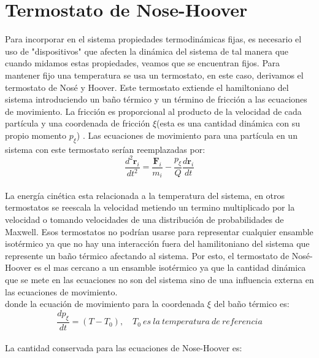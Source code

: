 \section{Termostato de Nose-Hoover}

Para incorporar en el sistema propiedades termodinámicas fijas, es necesario el uso de "dispositivos" que afecten la dinámica del sistema de tal manera que cuando midamos estas propiedades, veamos que se encuentran fijos. Para mantener fijo una temperatura se usa un termostato, en este caso, derivamos el termostato de Nosé y Hoover. Este termostato extiende el hamiltoniano del sistema introduciendo un baño térmico y un término de fricción a las ecuaciones de movimiento. La fricción es proporcional al producto de la velocidad de cada partícula y una coordenada de fricción $\xi$(esta es una cantidad dinámica con su propio momento $p_\xi$)\cite{evans1985} \cite{gromacsdoc}. Las ecuaciones de movimiento para una partícula en un sistema con este termostato serían reemplazadas por:\\

\begin{equation} \label{NHmotion}
    \frac{d^2\mathbf{r}_i}{dt^2} = \frac{\mathbf{F}_i}{m_i}-\frac{p_\xi}{Q}\frac{d\mathbf{r}_i}{dt}
\end{equation}\\

La energía cinética esta relacionada a la temperatura del sistema, en otros termostatos se reescala la velocidad metiendo un termino multiplicado por la velocidad o tomando velocidades de una distribución de probabilidades de Maxwell. Esos termostatos no podrían usarse para representar cualquier ensamble isotérmico ya que no hay una interacción fuera del hamilitoniano del sistema que represente un baño térmico afectando al sistema. Por esto, el termostato de Nosé-Hoover es el mas cercano a un ensamble isotérmico ya que la cantidad dinámica que se mete en las ecuaciones no son del sistema sino de una influencia externa en las ecuaciones de movimiento.\\

donde la ecuación de movimiento para la coordenada $\xi$ del baño térmico es:\\

\begin{equation}
    \frac{dp_\xi}{dt}=(T-T_0),\quad T_0\ es\ la\ temperatura\ de\ referencia
\end{equation}\\

La cantidad conservada para las ecuaciones de Nose-Hoover es:\\

